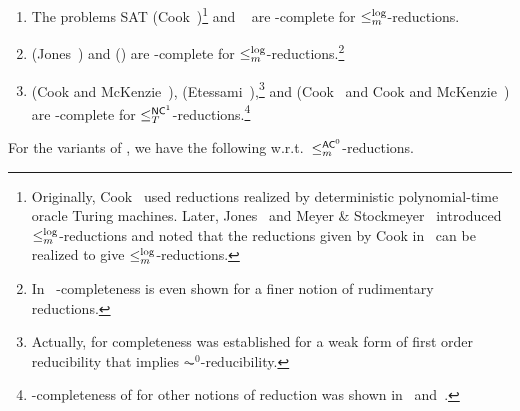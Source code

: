 \begin{theorem} \label{prelim:thm:complexities} \label{prelim:thm:THREESAT}\label{prelim:compl:thm:ONEDAG}
\begin{enumerate}
\item The problems {\sc SAT}
(Cook~\cite{Cook71})\footnote{
	Originally, Cook~\cite{Cook71} used reductions
	realized by deterministic polynomial-time
	oracle Turing machines.
	Later, Jones~\cite{Jones75}
	and Meyer \& Stockmeyer~\cite{Stockmeyer73} introduced $\le_m^{\log}$-reductions
	and noted that the reductions given by Cook	in~\cite{Cook71} 
	can be realized to give $\le_m^{\log}$-reductions.
}
and \THREESAT~\cite{Karp1972} are \NP-complete for $\le_m^{\log}$-reductions.

\item \DAG (Jones~\cite[Cor. 25]{Jones75}) and \SCC (\cite[Cor. 24]{Jones75})
 are \NL-complete for $\le_m^{\log}$-reductions.\footnote{In~\cite{Jones75}
 \NL-completeness is even shown for a finer notion of rudimentary reductions.}
 
\item \label{prelim:thm:complexities:ORD} \SCP (Cook and McKenzie~\cite{CookM87}), \ORD (Etessami~\cite[Thm.~4.1]{DBLP:journals/jcss/Etessami97}),\footnote{Actually, for \ORD completeness was
	established for a weak form of first order reducibility 
	that implies $\AC^0$-reducibility.}
 and \ONEDAG (Cook~\cite[p.~110]{Cook81} and Cook and McKenzie~\cite[p.~390]{CookM87}) are \LOGSPACE-complete for $\le_T^{\textup{\textsf{NC}}^{1}}$-reductions.\footnote{ \LOGSPACE-completeness of \ONEDAG for other notions of reduction was shown 
 in~\cite[Thm.~2.1]{DBLP:conf/focs/HartmanisIM78} 
 and~\cite[Cor.~25]{Jones75}.}
\end{enumerate}
\end{theorem}

For the variants of \KDAG, we have the following w.r.t.~$\le_m^{\textup{\textsf{AC}}^0}$-reductions.

